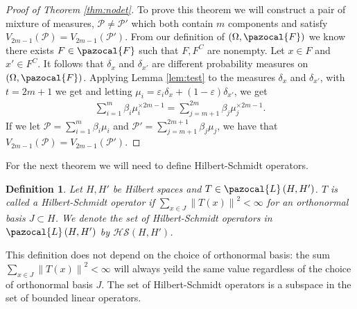 \documentclass[aos]{imsart}
\def\l{\left}
\def\r{\right}
\def\sF{\pazocal{F}}
\def\sP{\mathscr{P}}
\def\sL{\pazocal{L}}
\def\hs{\mathscr{HS}}
\theoremstyle{plain}
\theoremstyle{defintion}
\newtheorem{defin}{Definition}[section]
\begin{document}
	\begin{proof}[Proof of Theorem \ref{thm:nodet}]
	To prove this theorem we will construct a pair of mixture of measures, $\sP \neq \sP'$ which both contain $m$ components and satisfy $V_{2m-1}\left( \sP \right) = V_{2m-1}\left( \sP' \right)$. From our definition of $\left( \Omega, \sF \right)$ we know there exists $F\in \sF$ such that $F, F^C$ are nonempty. Let $x\in F$ and $x' \in F^C$. It follows that $\delta_{x}$ and $\delta_{x'}$ are different probability measures on $\left( \Omega, \sF \right)$.
	Applying Lemma \ref{lem:test} to the measures $\delta_x$ and $\delta_{x'}$, with $t=2m+1$ we get and letting $\mu_i = \varepsilon_i \delta_x + \left( 1-\varepsilon \right)\delta_{x'}$, we get 
	\begin{eqnarray*}
		\sum_{i=1}^m \beta_i \mu_i^{\times 2m-1} = \sum_{j=m+1}^{2m} \beta_j \mu_j^{\times 2m-1}.
	\end{eqnarray*}
	If we let $\sP = \sum_{i=1}^m \beta_i \mu_i$ and $\sP' = \sum_{j=m+1}^{2m+1} \beta_j \mu_j$, we have that $V_{2m-1}\left( \sP \right)= V_{2m-1}\left( \sP' \right)$.
\end{proof}

	For the next theorem we will need to define Hilbert-Schmidt operators.
	\begin{defin} \label{def:hs}
		Let $H,H'$ be Hilbert spaces and $T\in \sL\left( H,H' \right)$. $T$ is called a {\em Hilbert-Schmidt operator} if $\sum_{x\in J} \l\|T\left( x \right)\r\|^2 < \infty$ for an orthonormal basis $J\subset H$. We denote the set of Hilbert-Schmidt operators in $\sL\left( H,H' \right)$ by $\hs\left( H,H' \right)$.
	\end{defin}
	This definition does not depend on the choice of orthonormal basis: the sum $\sum_{x\in J} \l\|T\left( x \right)\r\|^2 < \infty$ will always yeild the same value regardless of the choice of orthonormal basis $J$. The set of Hilbert-Schmidt operators is a subspace in the set of bounded linear operators.
\end{document}
